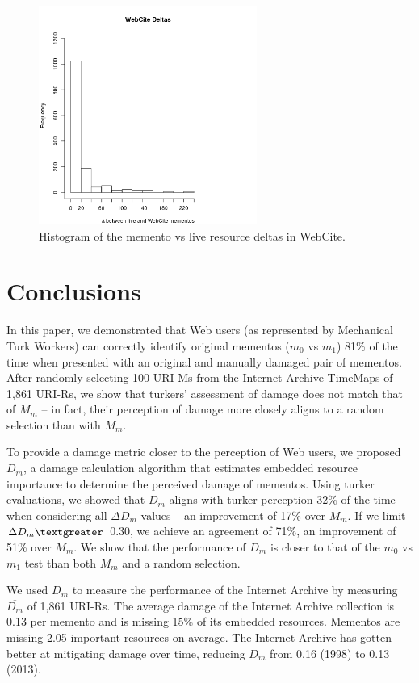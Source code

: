 \begin{figure}[h!]
\includegraphics[width=270px]{./imgs/wcHisto.png}
\caption{Histogram of the memento vs live resource deltas in WebCite.}
\label{wchisto}
\end{figure}


\section{Conclusions}
\label{conclusion}
In this paper, we demonstrated that Web users (as represented by Mechanical Turk Workers) can correctly identify original mementos ($m_0$ vs $m_1$) 81\% of the time when presented with an original and manually damaged pair of mementos. After randomly selecting 100 URI-Ms from the Internet Archive TimeMaps of 1,861 URI-Rs, we show that turkers' assessment of damage does not match that of $M_m$ -- in fact, their perception of damage more closely aligns to a random selection than with $M_m$. 

To provide a damage metric closer to the perception of Web users, we proposed $D_m$, a damage calculation algorithm that estimates embedded resource importance to determine the perceived damage of mementos. Using turker evaluations, we showed that $D_m$ aligns with turker perception 32\% of the time when considering all {$\Delta D_m$} values -- an improvement of 17\% over $M_m$. If we limit {$\Delta D_m \textgreater$} 0.30, we achieve an agreement of 71\%, an improvement of 51\% over $M_m$. We show that the performance of $D_m$ is closer to that of the $m_0$ vs $m_1$ test than both $M_m$ and a random selection.

We used $D_m$ to measure the performance of the Internet Archive by measuring $\overline{D_m}$ of 1,861 URI-Rs. The average damage of the Internet Archive collection is 0.13 per memento and is missing 15\% of its embedded resources. Mementos are missing 2.05 important resources on average. The Internet Archive has gotten better at mitigating damage over time, reducing $D_m$ from 0.16 (1998) to 0.13 (2013). 

